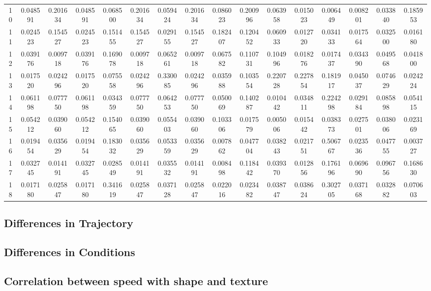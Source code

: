 \documentclass{article}
\begin{document}
\begin{landscape}
\begin{table}[htbp]
\begin{tabular}{cccccccccccccccc}
10 & 0.048591 & 0.201634 & 0.048591 & 0.068500 & 0.201634 & 0.059424 & 0.201634 & 0.086023 & 0.200996 & 0.063958 & 0.015023 & 0.006449 & 0.008201 & 0.033840 & 0.185953 \\
11 & 0.024523 & 0.154527 & 0.024523 & 0.151455 & 0.154527 & 0.029155 & 0.154527 & 0.182407 & 0.120452 & 0.060933 & 0.012720 & 0.034133 & 0.017564 & 0.032500 & 0.016180 \\
12 & 0.039176 & 0.009718 & 0.039176 & 0.169078 & 0.009718 & 0.065261 & 0.009718 & 0.067582 & 0.110731 & 0.104996 & 0.018276 & 0.017437 & 0.034390 & 0.049568 & 0.041800 \\
13 & 0.017520 & 0.024296 & 0.017520 & 0.075558 & 0.024296 & 0.330085 & 0.024296 & 0.035988 & 0.103554 & 0.220728 & 0.227854 & 0.181917 & 0.045037 & 0.074629 & 0.024224 \\
14 & 0.061198 & 0.077750 & 0.061198 & 0.034359 & 0.077750 & 0.064253 & 0.077750 & 0.050069 & 0.140287 & 0.010442 & 0.034811 & 0.224298 & 0.029184 & 0.085898 & 0.054115 \\
15 & 0.054212 & 0.039060 & 0.054212 & 0.154065 & 0.039060 & 0.055403 & 0.039060 & 0.103306 & 0.017579 & 0.005006 & 0.015442 & 0.038373 & 0.027501 & 0.038006 & 0.023169 \\
16 & 0.019454 & 0.035629 & 0.019454 & 0.183032 & 0.035629 & 0.053359 & 0.035629 & 0.007862 & 0.047704 & 0.038243 & 0.021751 & 0.506767 & 0.023536 & 0.047755 & 0.003727 \\
17 & 0.032745 & 0.014191 & 0.032745 & 0.028549 & 0.014191 & 0.035532 & 0.014191 & 0.008498 & 0.118442 & 0.039370 & 0.012856 & 0.176196 & 0.069690 & 0.096756 & 0.168630 \\
18 & 0.017180 & 0.025847 & 0.017180 & 0.341619 & 0.025847 & 0.037128 & 0.025847 & 0.022016 & 0.023482 & 0.038747 & 0.038624 & 0.302705 & 0.037168 & 0.032882 & 0.070603 \\
\end{tabular}
\end{table}
\end{landscape} %



\subsection*{Differences in Trajectory}
\subsection*{Differences in Conditions}
\subsection*{Correlation between speed with shape and texture}
\end{document}
